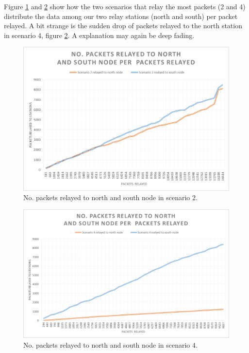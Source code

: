 \noindent Figure \ref{fig:nopacketsrelayedscenario2} and \ref{fig:nopacketsrelayedscenario4} show how the two scenarios that relay the most packets (2 and 4) distribute the data among our two relay stations (north and south) per packet relayed. A bit strange is the sudden drop of packets relayed to the north station in scenario 4, figure  \ref{fig:nopacketsrelayedscenario4}. A explanation may again be deep fading.

\begin{figure}[h]
	\centering
	\includegraphics[width=1\linewidth]{results/NoPacketsRelayedScenario2}
	\caption{No. packets relayed to north and south node in scenario 2.}
	\label{fig:nopacketsrelayedscenario2}
\end{figure}

\begin{figure}[h]
	\centering
	\includegraphics[width=1\linewidth]{results/NoPacketsRelayedScenario4}
	\caption{No. packets relayed to north and south node in scenario 4.}
	\label{fig:nopacketsrelayedscenario4}
\end{figure}

